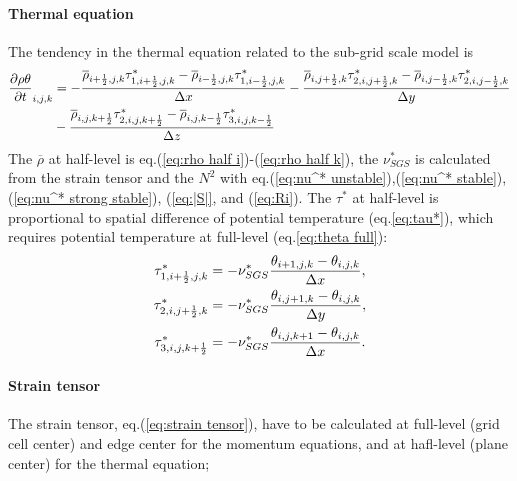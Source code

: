 \paragraph{Thermal equation}
The tendency in the thermal equation related to the sub-grid scale model is
\begin{align}
  \frac{\partial \rho \theta}{\partial t}_{i,j,k} &=
  - \frac{\overline{\rho}_{i+\frac{1}{2},j,k}\tau^*_{1,i+\frac{1}{2},j,k}-\overline{\rho}_{i-\frac{1}{2},j,k}\tau^*_{1,i-\frac{1}{2},j,k}}{\Delta x}
  - \frac{\overline{\rho}_{i,j+\frac{1}{2},k}\tau^*_{2,i,j+\frac{1}{2},k}-\overline{\rho}_{i,j-\frac{1}{2},k}\tau^*_{2,i,j-\frac{1}{2},k}}{\Delta y} \nonumber \\
  &- \frac{\overline{\rho}_{i,j,k+\frac{1}{2}}\tau^*_{2,i,j,k+\frac{1}{2}}-\overline{\rho}_{i,j,k-\frac{1}{2}}\tau^*_{3,i,j,k-\frac{1}{2}}}{\Delta z}
\end{align}
The $\overline{\rho}$ at half-level is eq.(\ref{eq:rho half i})-(\ref{eq:rho half k}),
the $\nu^*_{SGS}$ is calculated from the strain tensor and the $N^2$ with eq.(\ref{eq:nu^* unstable}),(\ref{eq:nu^* stable}), (\ref{eq:nu^* strong stable}), (\ref{eq:|S|}, and (\ref{eq:Ri}).
The $\tau^*$ at half-level
is proportional to spatial difference of potential temperature
(eq.\ref{eq:tau*}),
which requires potential temperature at full-level (eq.\ref{eq:theta full}):
\begin{align}
  \tau^*_{1,i+\frac{1}{2},j,k} &= -\nu^*_{SGS} \frac{\theta_{i+1,j,k}-\theta_{i,j,k}}{\Delta x}, \\
  \tau^*_{2,i,j+\frac{1}{2},k} &= -\nu^*_{SGS} \frac{\theta_{i,j+1,k}-\theta_{i,j,k}}{\Delta y}, \\
  \tau^*_{3,i,j,k+\frac{1}{2}} &= -\nu^*_{SGS} \frac{\theta_{i,j,k+1}-\theta_{i,j,k}}{\Delta x}. \\
\end{align}



\paragraph{Strain tensor}
The strain tensor, eq.(\ref{eq:strain tensor}), have to be calculated
at full-level (grid cell center) and edge center for the momentum equations,
and at hafl-level (plane center) for the thermal equation;

